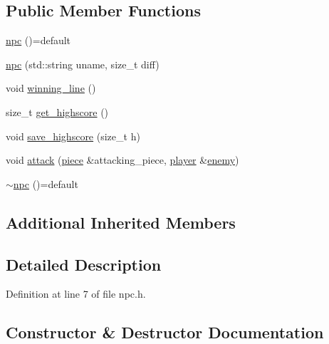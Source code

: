 \subsection*{Public Member Functions}
\begin{DoxyCompactItemize}
\item 
\hyperlink{classbattle__ship_1_1npc_ab92a83aba6dbf1060ebdb666087790b8}{npc} ()=default
\item 
\hyperlink{classbattle__ship_1_1npc_a6a5c77aa108694177865edb9c2d06947}{npc} (std\+::string uname, size\+\_\+t diff)
\item 
void \hyperlink{classbattle__ship_1_1npc_a10c65edd38e75ac6be91ecd2dc9c9866}{winning\+\_\+line} ()
\item 
size\+\_\+t \hyperlink{classbattle__ship_1_1npc_acb3ad1c27c948ae968697c795f10a6b9}{get\+\_\+highscore} ()
\item 
void \hyperlink{classbattle__ship_1_1npc_ab81843d30e5f8801a8fe479d44ead157}{save\+\_\+highscore} (size\+\_\+t h)
\item 
void \hyperlink{classbattle__ship_1_1npc_abe6ec844c73c5410c2c4887fd50fac06}{attack} (\hyperlink{classbattle__ship_1_1piece}{piece} \&attacking\+\_\+piece, \hyperlink{classbattle__ship_1_1player}{player} \&\hyperlink{classbattle__ship_1_1player_af01292346caaf209039b6490ae18d8aa}{enemy})
\item 
\hyperlink{classbattle__ship_1_1npc_ab548776b810769c0af009f1db0df4ede}{$\sim$npc} ()=default
\end{DoxyCompactItemize}
\subsection*{Additional Inherited Members}


\subsection{Detailed Description}


Definition at line 7 of file npc.\+h.



\subsection{Constructor \& Destructor Documentation}
\mbox{\label{classbattle__ship_1_1npc_ab92a83aba6dbf1060ebdb666087790b8}} 
